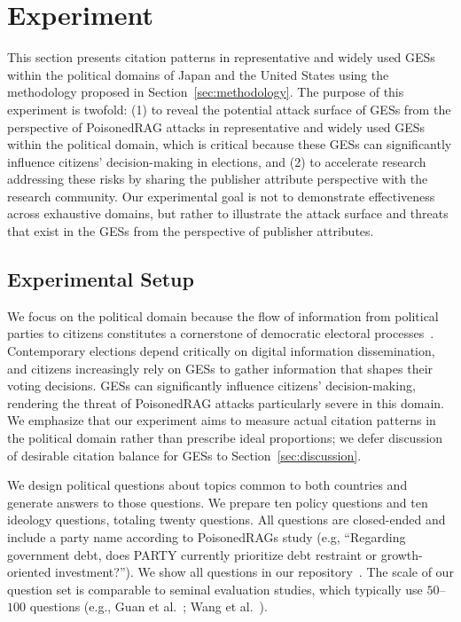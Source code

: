\section{Experiment}
\label{sec:experiment}
This section presents citation patterns in representative and widely used GESs within the political domains of Japan and the United States using the methodology proposed in Section~\ref{sec:methodology}.
The purpose of this experiment is twofold: (1) to reveal the potential attack surface of GESs from the perspective of PoisonedRAG attacks in representative and widely used GESs within the political domain, which is critical because these GESs can significantly influence citizens' decision-making in elections, and (2) to accelerate research addressing these risks by sharing the publisher attribute perspective with the research community.
Our experimental goal is not to demonstrate effectiveness across exhaustive domains, but rather to illustrate the attack surface and threats that exist in the GESs from the perspective of publisher attributes.



\subsection{Experimental Setup}
We focus on the political domain because the flow of information from political parties to citizens constitutes a cornerstone of democratic electoral processes~\cite{the-trust-gap-young-peoples-tactics-for-assessing-the-reliability-of-political-news-ijpp22, kovach2007elements}.
Contemporary elections depend critically on digital information dissemination, and citizens increasingly rely on GESs to gather information that shapes their voting decisions.
GESs can significantly influence citizens' decision-making, rendering the threat of PoisonedRAG attacks particularly severe in this domain.
We emphasize that our experiment aims to measure actual citation patterns in the political domain rather than prescribe ideal proportions; we defer discussion of desirable citation balance for GESs to Section~\ref{sec:discussion}.

We design political questions about topics common to both countries and generate answers to those questions.
We prepare ten policy questions and ten ideology questions, totaling twenty questions.
All questions are closed-ended and include a party name according to PoisonedRAGs study (e.g, ``Regarding government debt, does {PARTY} currently prioritize debt restraint or growth-oriented investment?'').
We show all questions in our repository~\cite{QL_CIKM_RERO}.
The scale of our question set is comparable to seminal evaluation studies, which typically use \(50\)--\(100\) questions (e.g., Guan et al.~\cite{guan2024language}; Wang et al.~\cite{wang2024factcheck}).

